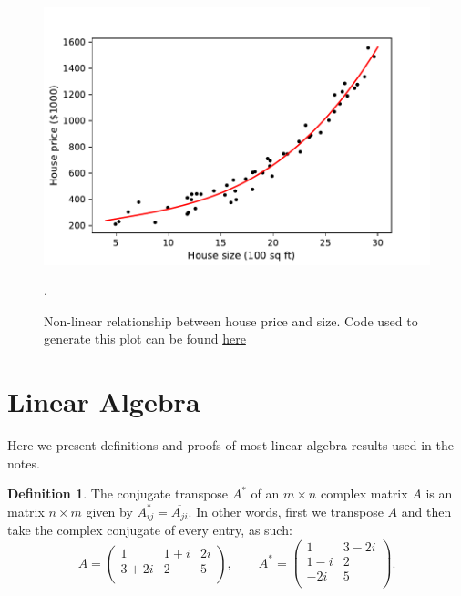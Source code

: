 \documentclass{article}
\theoremstyle{definition}
\newtheorem{definition}{Definition}[section]
\begin{document}
\begin{figure}[ht]
\centering
\includegraphics[scale=0.7]{images/lin_reg/poly-data.pdf}
\caption{Non-linear relationship between house price and size. Code used to generate this plot can be found \href{https://github.com/siavashaslanbeigi/ml_notes_supp/blob/master/lin_reg/poly.ipynb}{\color{blue} here}}.
\label{linreg-fig:poly-data}
\end{figure}


\appendix
\section{Linear Algebra}
Here we present definitions and proofs of most linear algebra results used in the notes.
\begin{definition}
The conjugate transpose $A^*$ of an $m\times n$ complex matrix $A$ is an matrix $n \times m$ given by $A^*_{ij}=\overline{A_{ji}}$. In other words, first we transpose $A$ and then take the complex conjugate of every entry, as such:
\begin{equation}
    A =
    \begin{pmatrix}
        1 & 1+i & 2i \\
        3+2i & 2 & 5 \\
    \end{pmatrix},
    \qquad
    A^* =
    \begin{pmatrix}
        1 & 3-2i \\
        1-i & 2 \\
        -2i & 5 \\
    \end{pmatrix}.
\end{equation}
\end{definition}
\end{document}
